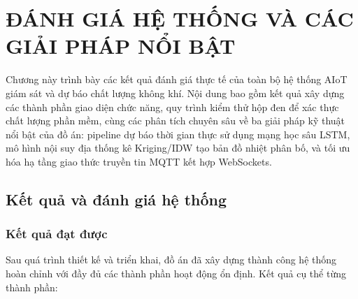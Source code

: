 \chapter{ĐÁNH GIÁ HỆ THỐNG VÀ CÁC GIẢI PHÁP NỔI BẬT}
\label{chap:contribution}

Chương này trình bày các kết quả đánh giá thực tế của toàn bộ hệ thống
AIoT giám sát và dự báo chất lượng không khí. Nội dung bao gồm kết quả xây dựng các thành phần giao diện chức năng, quy trình kiểm thử hộp đen để xác thực chất lượng phần mềm, cùng các phân tích chuyên sâu về ba giải pháp kỹ thuật nổi bật của đồ án: pipeline dự báo thời gian thực sử dụng mạng học sâu LSTM, mô hình nội suy địa thống kê Kriging/IDW tạo bản đồ nhiệt phân bố, và tối ưu hóa hạ tầng giao thức truyền tin MQTT kết hợp WebSockets.

\section{Kết quả và đánh giá hệ thống}
\label{sec:design:evaluation}

\subsection{Kết quả đạt được}
\label{subsec:design:result}

Sau quá trình thiết kế và triển khai, đồ án đã xây dựng thành công hệ
thống hoàn chỉnh với đầy đủ các thành phần hoạt động ổn định. Kết quả
cụ thể từng thành phần:

